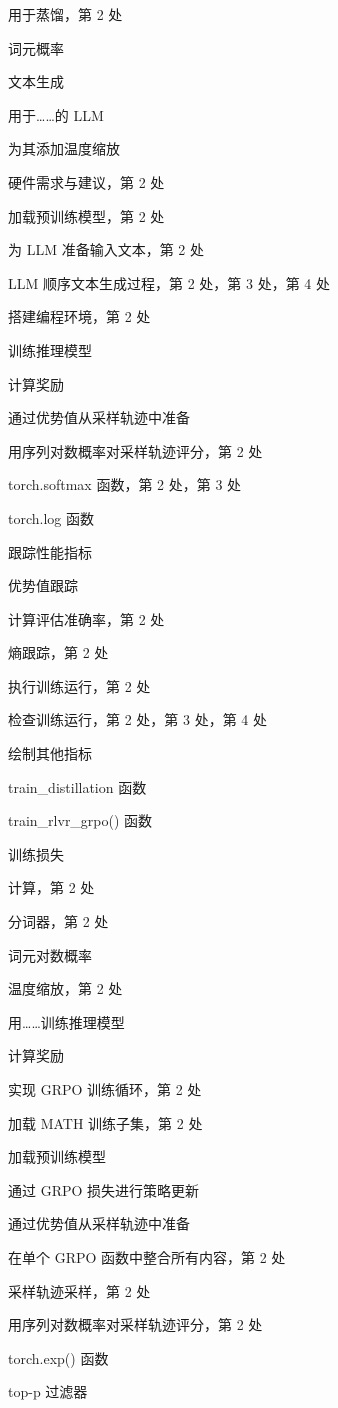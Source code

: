 用于蒸馏，第 2 处

词元概率

文本生成

用于……的 LLM

为其添加温度缩放

硬件需求与建议，第 2 处

加载预训练模型，第 2 处

为 LLM 准备输入文本，第 2 处

LLM 顺序文本生成过程，第 2 处，第 3 处，第 4 处

搭建编程环境，第 2 处

训练推理模型

计算奖励

通过优势值从采样轨迹中准备

用序列对数概率对采样轨迹评分，第 2 处

torch.softmax 函数，第 2 处，第 3 处

torch.log 函数

跟踪性能指标

优势值跟踪

计算评估准确率，第 2 处

熵跟踪，第 2 处

执行训练运行，第 2 处

检查训练运行，第 2 处，第 3 处，第 4 处

绘制其他指标

train\_distillation 函数

train\_rlvr\_grpo() 函数

训练损失

计算，第 2 处

分词器，第 2 处

词元对数概率

温度缩放，第 2 处

用……训练推理模型

计算奖励

实现 GRPO 训练循环，第 2 处

加载 MATH 训练子集，第 2 处

加载预训练模型

通过 GRPO 损失进行策略更新

通过优势值从采样轨迹中准备

在单个 GRPO 函数中整合所有内容，第 2 处

采样轨迹采样，第 2 处

用序列对数概率对采样轨迹评分，第 2 处

torch.exp() 函数

top-p 过滤器

